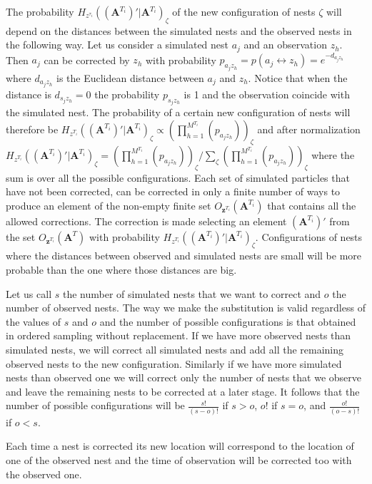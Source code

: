 \documentclass[11pt,a4paper]{article}
\renewcommand{\vec}[1]{\mathbf{#1}}
\begin{document}
The probability $H_{z^{\tau_i}}((\vec{A}^{T_i})' | \vec{A}^{T_i})_{\zeta}$ of the new configuration of nests $\zeta$ will depend on the distances between the simulated nests and the observed nests in the following way. Let us consider a simulated nest $a_j$ and an observation $z_h$. Then $a_j$ can be corrected by $z_h$ with probability $p_{a_j z_h} = p(a_j \leftrightarrow z_h) = e^{-d_{a_j z_h}}$ where $d_{a_j z_h}$ is the Euclidean distance between $a_j$ and $z_h$. Notice that when the distance is $d_{s_j z_h} = 0$ the probability $p_{s_j z_h}$ is 1 and the observation coincide with the simulated nest. The probability of a certain new configuration of nests will therefore be $H_{z^{T_i}}((\vec{A}^{T_i})' | \vec{A}^{T_i})_{\zeta} \propto (\prod_{h = 1}^{M^{T_i}} (p_{a_j z_h}))_{\zeta}$ and after normalization $H_{z^{T_i}}((\vec{A}^{T_i})' | \vec{A}^{T_i})_{\zeta} = (\prod_{h = 1}^{M^{T_i}} (p_{a_j z_h}))_{\zeta} / \sum_{\zeta} (\prod_{h = 1}^{M^{T_i}} (p_{a_j z_h}))_{\zeta} $ where the sum is over all the possible configurations. Each set of simulated particles that have not been corrected, can be corrected in only a finite number of ways to produce an element of the non-empty finite set $O_{\vec{z}^{T_i}} (\vec{A}^{T_i})$ that contains all the allowed corrections. The correction is made selecting an element $(\vec{A}^{T_i})'$ from the set $O_{\vec{z}^{T_i}} (\vec{A}^T)$ with probability $H_{z^{T_i}}((\vec{A}^{T_i})' | \vec{A}^{T_i})_{\zeta}$. Configurations of nests where the distances between observed and simulated nests are small will be more probable than the one where those distances are big.

Let us call $s$ the number of simulated nests that we want to correct and $o$ the number of observed nests. The way we make the substitution is valid regardless of the values of $s$ and $o$ and the number of possible configurations is that obtained in ordered sampling without replacement. If we have more observed nests than simulated nests, we will correct all simulated nests and add all the remaining observed nests to the new configuration. Similarly if we have more simulated nests than observed one we will correct only the number of nests that we observe and leave the remaining nests to be corrected at a later stage.
It follows that the number of possible configurations will be $\frac{s!}{(s-o)!}$ if $s > o$, $o!$ if $s = o$, and $\frac{o!}{(o-s)!}$ if $o < s$.

Each time a nest is corrected its new location will correspond to the location of one of the observed nest and the time of observation will be corrected too with the observed one.
\end{document}
